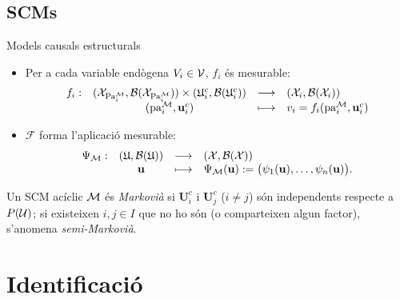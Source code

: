 \documentclass{bestbeamer}
\begin{document}
\subsection{SCMs}
\begin{frame}{Models causals estructurals}\label{frame:SCM2}
\small
\begin{itemize}
  \item Per a cada variable endògena $V_i\in\mathcal{V}$, $f_i$ és mesurable:
  \begin{equation*}
  \begin{array}{cccl}
  f_i: & (\mathcal{X}_{\operatorname{Pa}_i^{\mathcal{M}}},\mathcal{B}(\mathcal{X}_{\operatorname{Pa}_i^{\mathcal{M}}}))\times(\mathfrak U_i^c,\mathcal{B}(\mathfrak U_i^c)) & \longrightarrow & (\mathcal X_i,\mathcal{B}(\mathcal{X}_i)) \\
  & (\operatorname{pa}_i^{\mathcal{M}},\mathbf u_i^c) & \longmapsto & v_i=f_i(\operatorname{pa}_i^{\mathcal{M}},\mathbf u_i^c)
  \end{array}
  \end{equation*}
  \item $\mathcal F$ forma l'aplicació mesurable: 
  \begin{equation*}
      \begin{array}{cccl}
      \Psi_{\mathcal{M}}: & (\mathfrak U,\mathcal{B}(\mathfrak U)) & \longrightarrow & (\mathcal X,\mathcal{B}(\mathcal{X})) \\
      & \mathbf u & \longmapsto & \Psi_{\mathcal{M}}(\mathbf u):= \bigl(\psi_1(\mathbf u),\ldots,\psi_n(\mathbf u)\bigr).
      \end{array}
  \end{equation*}
\end{itemize}
\begin{definition}
Un SCM acíclic $\mathcal{M}$ és \textit{Markovià} si $\mathbf{U}_i^c$ i $\mathbf{U}_j^c$ ($i\neq j$) són independents respecte a $P(\mathcal{U})$; si existeixen $i,j\in I$ que no ho són (o comparteixen algun factor), s'anomena \textit{semi-Markovià}.
\end{definition}
\vfill
\hfill{}
\end{frame}

\section{Identificació}
\end{document}
